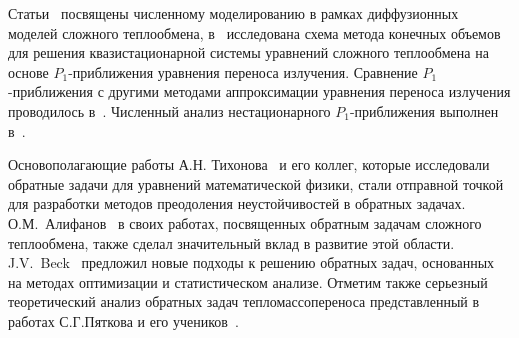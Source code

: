     Статьи~\cite{kovtanyuk2013iterative, Thommes2002, Pinnau2008, Siewert1991}
    посвящены численному моделированию в рамках
    диффузионных моделей сложного теплообмена, в~\cite{gallouet2016analysis} исследована схема
    метода конечных объемов для решения квазистационарной системы
    уравнений сложного теплообмена на основе
    $P_1$-приближения уравнения переноса излучения.
    Сравнение $P_1$-приближения с другими методами
    аппроксимации уравнения переноса излучения проводилось
    в~\cite{modest2014elliptic, frank2011adaptive, kovtanyuk2012, Thommes2002, Larsen2002, Frank2007}.
    Численный анализ нестационарного $P_1$-приближения выполнен
    в~\cite{Addam2015, olbrant2013asymptotic, frank2010optimal, frank2011adaptive, Frank2007}.

    Основополагающие работы А.Н. Тихонова~\cite{TikhonovSamarskii1972} и его коллег, которые
    исследовали обратные задачи для уравнений математической физики, стали
    отправной точкой для разработки методов преодоления неустойчивостей в обратных задачах.
    О.М.\ Алифанов~\cite{Aliphanov77, Aliphanov99, Aliphanov2009}
    в своих работах, посвященных обратным задачам сложного теплообмена, также
    сделал значительный вклад в развитие этой области.
    J.V.\ Beck~\cite{Beck1985-fg} предложил
    новые подходы к решению обратных задач, основанных на методах
    оптимизации и статистическом анализе.
    Отметим также серьезный теоретический анализ обратных задач тепломассопереноса
    представленный в работах С.Г.Пяткова и его учеников~\cite{Pyatkov19, Pyatkov22, Pyatkov23}.


